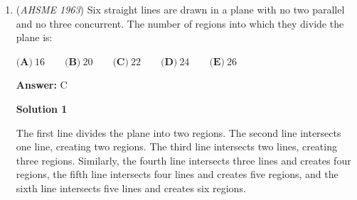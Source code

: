 \begin{enumerate}
 \textbf{Answer: }E



\textbf{Solution}

Statement $1$ states that $p$ is true and $q$ is false.  Therefore, $p \rightarrow q$ is false, because a premise being true and a conclusion being false is, itself, false.  This means that $(p \rightarrow q) \rightarrow X$, where $X$ is any logical statement (or series of logical statements) must be true - if your premise is false, then the implication is automatically true.  So statement $1$ implies the truth of the given statement.

 Statement $3$ similarly has $p$ as true and $q$ is false, so it also implies the truth of the given statement.

 Statement $2$ states that $p$ and $q$ are both false.  This in turn means that $p \rightarrow q$ is true.  Since $r$ is also true from statement $2$, this means that $(p \rightarrow q) \rightarrow r$ is true, since $T \rightarrow T$ is $T$.  Thus statement $2$ implies the truth of the given statement.

 Statement $4$ states that $p$ is false and $q$ is true.  In this case, $p \rightarrow q$ is true - your conclusion can be true even if your premise is false.  And, since $r$ is also true from statement $4$, this means $(p \rightarrow q) \rightarrow r$ is true.  Thus, statement $4$ implies the truth of the given statement.

 All four statements imply the truth of the given statement, so the answer is $\boxed{\textbf{(E)}}$



	\item (\textit{AHSME 1963}) Six straight lines are drawn in a plane with no two parallel and no three concurrent. The number of regions into which they divide the plane is:


 $\textbf{(A)}\ 16 \qquad \textbf{(B)}\ 20\qquad \textbf{(C)}\ 22 \qquad \textbf{(D)}\ 24 \qquad \textbf{(E)}\ 26$

 \textbf{Answer: }C



\textbf{Solution 1}

The first line divides the plane into two regions.  The second line intersects one line, creating two regions.  The third line intersects two lines, creating three regions.  Similarly, the fourth line intersects three lines and creates four regions, the fifth line intersects four lines and creates five regions, and the sixth line intersects five lines and creates six regions.


\end{enumerate}
